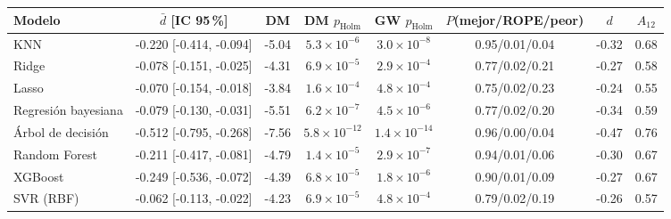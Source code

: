 \begin{tabular}{lccccccc}
\toprule
Modelo & $\bar d$ [IC 95\,\%] & DM & DM $p_{\mathrm{Holm}}$ & GW $p_{\mathrm{Holm}}$ & $P$(mejor/ROPE/peor) & $d$ & $A_{12}$ \\
\midrule
KNN & -0.220 [-0.414, -0.094] & -5.04 & $5.3\times10^{-6}$ & $3.0\times10^{-8}$ & 0.95/0.01/0.04 & -0.32 & 0.68 \\
Ridge & -0.078 [-0.151, -0.025] & -4.31 & $6.9\times10^{-5}$ & $2.9\times10^{-4}$ & 0.77/0.02/0.21 & -0.27 & 0.58 \\
Lasso & -0.070 [-0.154, -0.018] & -3.84 & $1.6\times10^{-4}$ & $4.8\times10^{-4}$ & 0.75/0.02/0.23 & -0.24 & 0.55 \\
Regresión bayesiana & -0.079 [-0.130, -0.031] & -5.51 & $6.2\times10^{-7}$ & $4.5\times10^{-6}$ & 0.77/0.02/0.20 & -0.34 & 0.59 \\
Árbol de decisión & -0.512 [-0.795, -0.268] & -7.56 & $5.8\times10^{-12}$ & $1.4\times10^{-14}$ & 0.96/0.00/0.04 & -0.47 & 0.76 \\
Random Forest & -0.211 [-0.417, -0.081] & -4.79 & $1.4\times10^{-5}$ & $2.9\times10^{-7}$ & 0.94/0.01/0.06 & -0.30 & 0.67 \\
XGBoost & -0.249 [-0.536, -0.072] & -4.39 & $6.8\times10^{-5}$ & $1.8\times10^{-6}$ & 0.90/0.01/0.09 & -0.27 & 0.67 \\
SVR (RBF) & -0.062 [-0.113, -0.022] & -4.23 & $6.9\times10^{-5}$ & $4.8\times10^{-4}$ & 0.79/0.02/0.19 & -0.26 & 0.57 \\
\bottomrule
\end{tabular}